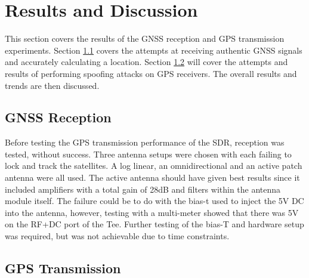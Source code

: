 
\chapter{Results and Discussion} %

\label{Chapter5} %

This section covers the results of the GNSS reception and GPS transmission experiments. Section \ref{sec:Res_GNSSReception} covers the attempts at receiving authentic GNSS
signals and accurately calculating a location. Section \ref{sec:Res_GPSTransmission} will cover the attempts and results of performing spoofing attacks on GPS receivers.
The overall results and trends are then discussed.

\section{GNSS Reception} \label{sec:Res_GNSSReception}
Before testing the GPS transmission performance of the SDR, reception was tested, without success. Three antenna setups were chosen with each failing to lock and track the
satellites. A log linear, an omnidirectional and an active patch antenna were all used. The active antenna should have given best results since it included amplifiers
with a total gain of 28dB and
filters within the antenna module itself. The failure could be to do with the bias-t used to inject the 5V DC into the antenna, however, testing with a multi-meter showed
that there was 5V on the RF+DC port of the Tee. Further testing of the bias-T and hardware setup was required, but was not achievable due to time constraints.


\section{GPS Transmission} \label{sec:Res_GPSTransmission}

